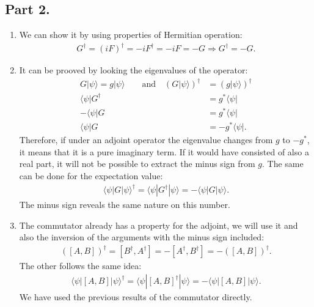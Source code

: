 \documentclass[letterpaper,11pt,twoside]{article}
\newcommand{\ket}[1]{|#1\rangle}
\newcommand{\bra}[1]{\langle#1|}
\newcommand{\braket}[1]{\langle#1\rangle}
\begin{document}
\subsection*{Part 2.}
\begin{enumerate}[itemsep=0pt,topsep=0pt,label=\alph*)]
  \item We can show it by using properties of Hermitian operation:
  \begin{align*}
      G^\dagger=(iF)^\dagger=-iF^\dagger=-iF=-G\Longrightarrow G^\dagger=-G.
  \end{align*}
  \item It can be prooved by looking the eigenvalues of the operator:
  \begin{align*}
    G\ket{\psi}=g\ket{\psi}\qquad\text{and}\quad(G\ket{\psi})^\dagger&=(g\ket{\psi})^\dagger\\
    \bra{\psi}G^\dagger&=g^*\bra{\psi}\\
    -\bra{\psi}G&=g^*\bra{\psi}\\
    \bra{\psi}G&=-g^*\bra{\psi}.
  \end{align*}
  Therefore, if under an adjoint operator the eigenvalue changes from $g$ to $-g^*$, it means that it is a pure imaginary term. If it would have consisted of also a real part,
  it will not be possible to extract the minus sign from $g$. The same can be done for the expectation value:
  \begin{align*}
    \braket{\psi|G|\psi}^\dagger=\braket{\psi|G^\dagger|\psi}=-\braket{\psi|G|\psi}.
  \end{align*}
  The minus sign reveals the same nature on this number.
  \item The commutator already has a property for the adjoint, we will use it and also the inversion of the arguments with the minus sign included:
  \begin{align*}
    ([A,B])^\dagger=[B^\dagger,A^\dagger]=-[A^\dagger,B^\dagger]=-([A,B])^\dagger.
  \end{align*}
  The other follows the same idea:
  \begin{align*}
    \braket{\psi|[A,B]|\psi}^\dagger=\braket{\psi|[A,B]^\dagger|\psi}=-\braket{\psi|[A,B]|\psi}.
  \end{align*}
  We have used the previous results of the commutator directly.
\end{enumerate}
\end{document}
